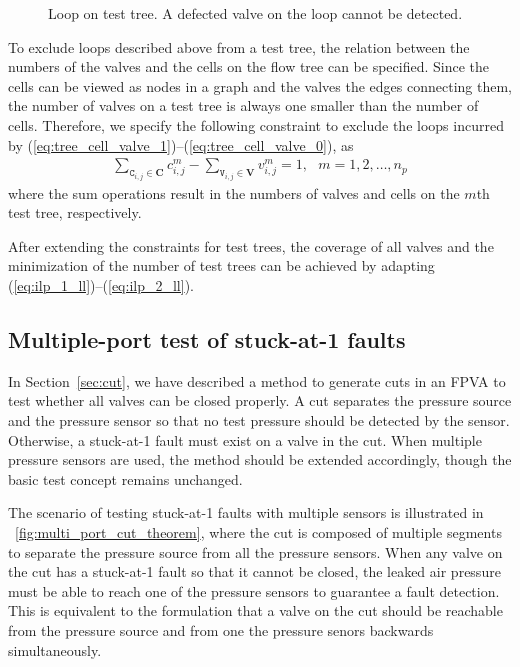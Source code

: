 \begin{figure}
{\figurefontsize
\centering

\caption{Loop on test tree. A defected valve on the loop cannot be detected.}
\label{fig:joint_loops}
}
\end{figure}

To exclude loops described above from a test tree, the relation between the numbers of the valves and
the
cells on the flow tree can be specified. Since the cells can be viewed as nodes
in a graph and the valves the edges connecting them, the number of valves on a
test tree is always one smaller than the number of cells. Therefore, we specify
the following constraint to exclude the loops incurred by 
 (\ref{eq:tree_cell_valve_1})--(\ref{eq:tree_cell_valve_0}), as
\begin{align}\label{eq:tree_cell_valve_jointloop}
  \sum_{\mathtt{C}_{i,j} \in \mathbf{C}} c^m_{i,j} -
  \sum_{\mathtt{V}_{i,j}\in \mathbf{V}} v^m_{i,j} 
  =1,\ \ \ m=1, 2,\dots, n_p
\end{align}
where the sum operations result in the numbers of valves and cells on the $m$th
test tree, respectively.

After extending the constraints for test trees, the coverage of all valves 
and the minimization of the number of test trees can be achieved by adapting
(\ref{eq:ilp_1_ll})--(\ref{eq:ilp_2_ll}).

\subsection{Multiple-port test of stuck-at-1 faults}
\label{sec:multiple_port_cut}

In Section~\ref{sec:cut}, we have described a method to generate cuts in an
FPVA to test whether all valves can be closed properly. A cut separates the
pressure source and the pressure sensor so that no test pressure should be
detected by the sensor. Otherwise, a stuck-at-1 fault must exist on a
valve in the cut. When multiple pressure sensors are used, the method should be
extended accordingly, though the basic test concept remains unchanged.

The scenario of testing stuck-at-1 faults with multiple sensors is illustrated in
\figname~\ref{fig:multi_port_cut_theorem}, where the cut is composed of
multiple segments to separate the pressure source from all the pressure
sensors.
When any valve on the cut has a stuck-at-1
fault so that it cannot be closed, the leaked air pressure must be able to reach
one of the pressure sensors to guarantee a fault detection. 
This is equivalent to the formulation that a valve
on the cut should be reachable from the pressure source and from one the
pressure senors backwards simultaneously.

